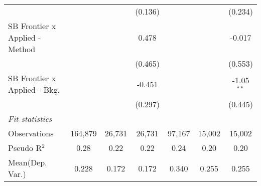\begin{tabular}{lcccccc}
                                  &                &               & (0.136)       &                &               & (0.234)\\   
   SB Frontier x Applied - Method &                &               & 0.478         &                &               & -0.017\\   
                                  &                &               & (0.465)       &                &               & (0.553)\\   
   SB Frontier x Applied - Bkg.   &                &               & -0.451        &                &               & -1.05$^{**}$\\   
                                  &                &               & (0.297)       &                &               & (0.445)\\   
   \midrule
   \emph{Fit statistics}\\
   Observations                   & 164,879        & 26,731        & 26,731        & 97,167         & 15,002        & 15,002\\  
   Pseudo R$^2$                   & 0.28           & 0.22          & 0.22          & 0.24           & 0.20          & 0.20\\  
Mean(Dep. Var.) & 0.228 & 0.172 & 0.172 & 0.340 & 0.255 & 0.255 \\
   

\end{tabular}
